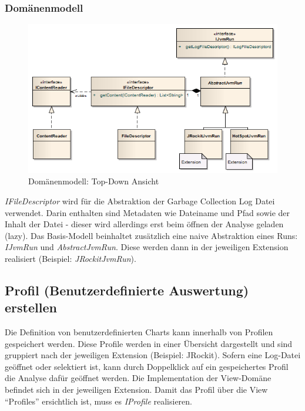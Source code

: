 \subsubsection{Domänenmodell}
 \begin{figure}[H]
  	\centering
        	\caption{Domänenmodell: Top-Down Ansicht}
    	\includegraphics[width=16cm]{images/core_domain}
\end{figure}
\textit{IFileDescriptor} wird für die Abstraktion der Garbage Collection Log Datei verwendet. Darin enthalten sind Metadaten wie Dateiname und Pfad sowie der Inhalt der Datei - dieser wird allerdings erst beim öffnen der Analyse geladen (lazy). Das Basis-Modell beinhaltet zusätzlich eine naive Abstraktion eines Runs: \textit{IJvmRun} und \textit{AbstractJvmRun}. Diese werden dann in der jeweiligen Extension realisiert (Beispiel: \textit{JRockitJvmRun}). 

\subsection{Profil (Benutzerdefinierte Auswertung) erstellen}
Die Definition von benutzerdefinierten Charts kann innerhalb von Profilen gespeichert werden. Diese Profile werden in einer Übersicht dargestellt und sind gruppiert nach der jeweiligen Extension (Beispiel: JRockit). Sofern eine Log-Datei geöffnet oder selektiert ist, kann durch Doppelklick auf ein gespeichertes Profil die Analyse dafür geöffnet werden. Die Implementation der View-Domäne befindet sich in der jeweiligen Extension. Damit das Profil über die View ``Profiles'' ersichtlich ist, muss es \textit{IProfile} realisieren.
